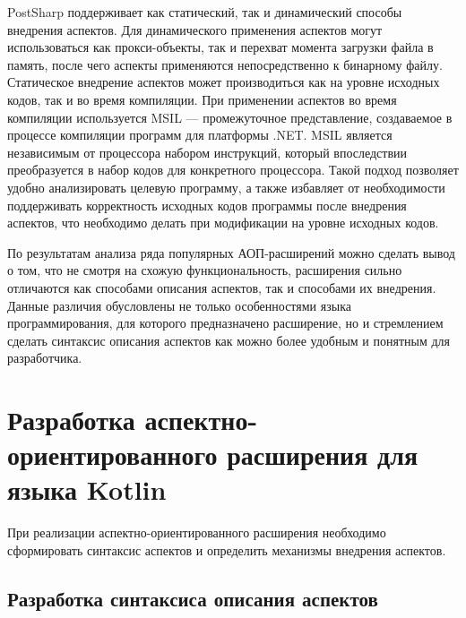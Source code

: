 \documentclass[conference]{IEEEtran}
\begin{document}
PostSharp поддерживает как статический, так и динамический способы внедрения
аспектов.
Для динамического применения аспектов могут использоваться как прокси-объекты,
так и перехват момента загрузки файла в память, после чего аспекты применяются
непосредственно к бинарному файлу.
Статическое внедрение аспектов может производиться как на уровне исходных кодов,
так и во время компиляции.
При применении аспектов во время компиляции используется MSIL --- промежуточное
представление, создаваемое в процессе компиляции программ для платформы .NET.
MSIL является независимым от процессора набором инструкций, который впоследствии
преобразуется в набор кодов для конкретного процессора.
Такой подход позволяет удобно анализировать целевую программу, а также
избавляет от необходимости поддерживать корректность исходных кодов программы
после внедрения аспектов, что необходимо делать при модификации на уровне
исходных кодов.


По результатам анализа ряда популярных АОП-расширений можно сделать вывод о том,
что не смотря на схожую функциональность, расширения сильно отличаются как
способами описания аспектов, так и способами их внедрения.
Данные различия обусловлены не только особенностями языка
программирования, для которого предназначено расширение, но и стремлением
сделать синтаксис описания аспектов как можно более удобным и понятным для
разработчика.


\section{Разработка аспектно-ориентированного расширения для языка Kotlin}

При реализации аспектно-ориентированного расширения необходимо сформировать
синтаксис аспектов и определить механизмы внедрения аспектов.

\subsection{Разработка синтаксиса описания аспектов}
\end{document}
